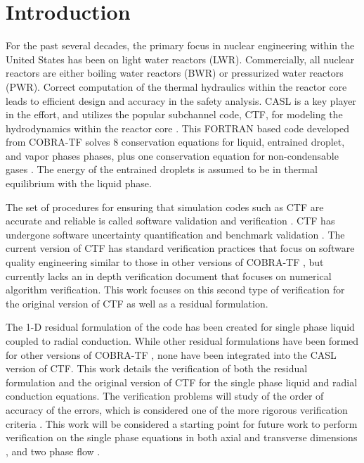 \vspace*{-80mm}
\chapter{Introduction} \label{chapter1:introduction}

For the past several decades, the primary focus in nuclear engineering within
the United States has been on light water reactors (LWR). Commercially,
all nuclear reactors are either boiling water reactors (BWR) or pressurized
water reactors (PWR). Correct computation of the thermal hydraulics within the
reactor core leads to efficient design and accuracy in the safety analysis. 
CASL is a key player in the effort, and utilizes the popular subchannel code,
CTF, for modeling the hydrodynamics within the reactor core \cite{Schmidt2014}.
This FORTRAN based code developed from COBRA-TF solves 8 conservation equations
for liquid, entrained droplet, and vapor phases phases, plus one conservation
equation for non-condensable gases \cite{CTF_theory}. The energy of the
entrained droplets is assumed to be in thermal equilibrium with the liquid
phase.

The set of procedures for ensuring that simulation codes such as CTF are
accurate and reliable is called software validation and verification
\cite{Oberkampf2008}. CTF has undergone software uncertainty quantification and
benchmark validation \cite{Avramova2015}. The current version of CTF has
standard verification practices that focus on software quality engineering
similar to those in other versions of COBRA-TF \cite{Aumiller2013}, but
currently lacks an in depth verification document that focuses on numerical
algorithm verification. This work focuses on this second type of verification
for the original version of CTF as well as a residual formulation. 

The 1-D residual formulation of the code has been created for single phase
liquid coupled to radial conduction. While other residual formulations have been
formed for other versions of COBRA-TF \cite{Lloyd2014}, none have been
integrated into the CASL version of CTF. This work details the verification of
both the residual formulation and the original version of CTF for the single
phase liquid and radial conduction equations. The verification problems will
study of the order of accuracy of the errors, which is considered one of the
more rigorous verification criteria \cite{Roy2005}. This work will be
considered a starting point for future work to perform verification on the
single phase equations in both axial and transverse dimensions
\cite{Merroun2009}, and two phase flow \cite{Mahadevan2009}.

